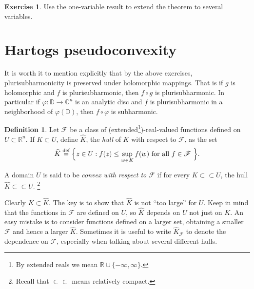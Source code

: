 \documentclass[12pt,openany]{book}
\newcommand{\C}{{\mathbb{C}}}
\newcommand{\R}{{\mathbb{R}}}
\newcommand{\D}{{\mathbb{D}}}
\newcommand{\sF}{{\mathscr{F}}}
\newcommand{\myindex}[1]{#1\index{#1}}
\theoremstyle{plain}
\theoremstyle{remark}
\theoremstyle{definition}
\newtheorem{defn}[thm]{Definition}
\newenvironment{exbox}{%
    \def\FrameCommand{\vrule width 1pt \relax\hspace {10pt}}%
    \MakeFramed {\advance \hsize -\width \FrameRestore }%
}{%
    \endMakeFramed
}
\theoremstyle{exercise}
\newtheorem{exercise}{Exercise}[section]
\theoremstyle{example}
\begin{document}
\begin{exbox}
\begin{exercise}
Use the one-variable result to extend the theorem to several variables.
\end{exercise}
\end{exbox}


\section{Hartogs pseudoconvexity}

It is worth it to mention explicitly that by the above
exercises, plurisubharmonicity is preserved under holomorphic mappings.
That is if $g$ is holomorphic and $f$ is plurisubharmonic, then
$f \circ g$ is plurisubharmonic.  In particular if $\varphi \colon \D \to
\C^n$ is an analytic disc and $f$ is plurisubharmonic in a neighborhood of
$\varphi(\D)$,
then $f \circ \varphi$ is subharmonic.

\begin{defn}
Let $\sF$ be a class of (extended\footnote{%
By extended reals we mean $\R \cup \{ -\infty,\infty\}$.})-real-valued functions defined on $U \subset \R^n$.  If $K
\subset U$, define $\widehat{K}$, the \emph{\myindex{hull}} of $K$ with
respect to $\sF$, as the set
\begin{equation*}
\widehat{K} \overset{\text{def}}{=} \Bigl\{ z \in U : f(z) \leq \sup_{w\in K} f(w)
\text{ for all $f \in \sF$ } \Bigr\} .
\end{equation*}

A domain $U$ is said to be \emph{convex with respect to $\sF$}\index{convex!with respect to $\sF$}
if for every $K \subset \subset U$, the hull $\widehat{K} \subset \subset U$.%
\footnote{Recall that $\subset \subset$ means relatively compact.}
\end{defn}

Clearly $K \subset \widehat{K}$.  The key is to show that $\widehat{K}$
is not ``too large'' for $U$.
Keep in mind that the functions in $\sF$ are defined on $U$, so $\widehat{K}$
depends on $U$ not just on $K$.  An easy mistake is to consider functions defined
on a larger set, obtaining a smaller $\sF$ and hence a larger
$\widehat{K}$.  Sometimes it is useful to write $\widehat{K}_{\sF}$ to
denote the dependence on $\sF$, especially when talking about several different
hulls.
\end{document}
